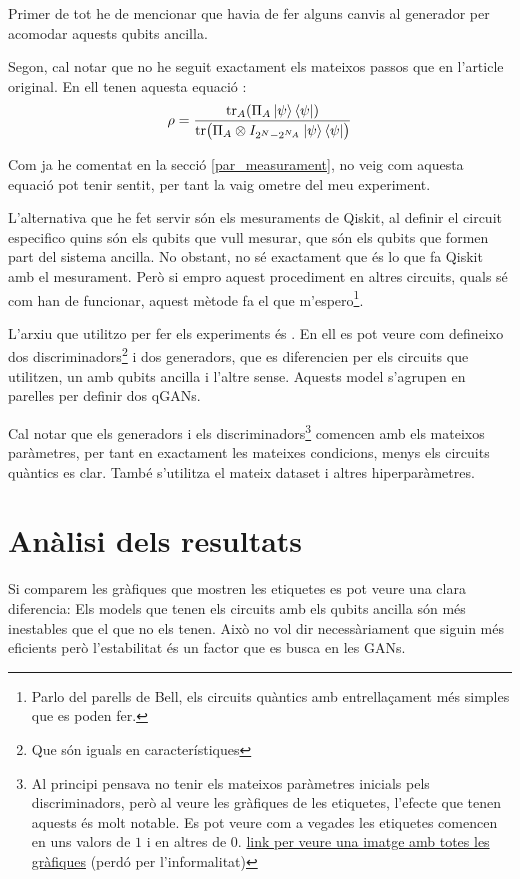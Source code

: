 Primer de tot he de mencionar que havia de fer alguns canvis al generador per acomodar aquests qubits ancilla. 

Segon, cal notar que no he seguit exactament els mateixos passos que en l'article original. En ell tenen aquesta equació \cite{QGAN_exp}: 
\begin{equation*}
\rho = \frac{\tr_A(\Pi_A \ket{\psi}\bra{\psi})}{\tr(\Pi_A\otimes I_{2^N-2^{N_A}}\ket{\psi}\bra{\psi})}
\end{equation*}

Com ja he comentat en la secció \ref{par_measurament}, no veig com aquesta equació pot tenir sentit, per tant la vaig ometre del meu experiment. 

L'alternativa que he fet servir són els mesuraments de Qiskit, al definir el circuit especifico quins són els qubits que vull mesurar, que són els qubits que formen part del sistema ancilla. No obstant, no sé exactament que és lo que fa Qiskit amb el mesurament. Però si empro aquest procediment en altres circuits, quals sé com han de funcionar, aquest mètode fa el que m'espero\footnote{Parlo del parells de Bell, els circuits quàntics amb entrellaçament més simples que es poden fer.}. 

L'arxiu que utilitzo per fer els experiments és . En ell es pot veure com defineixo dos discriminadors\footnote{Que són iguals en característiques} i dos generadors, que es diferencien per els circuits que utilitzen, un amb qubits ancilla i l'altre sense. Aquests model s'agrupen en parelles per definir dos qGANs. 

Cal notar que els generadors i els discriminadors\footnote{Al principi pensava no tenir els mateixos paràmetres inicials pels discriminadors, però al veure les gràfiques de les etiquetes, l'efecte que tenen aquests és molt notable. Es pot veure com a vegades les etiquetes comencen en uns valors de $1$ i en altres de $0$. \href{https://drive.google.com/file/d/1kYZ1vmNYU17sofNluXFYnoATLfY5B0jG/view?usp=sharing}{link per veure una imatge amb totes les gràfiques} (perdó per l'informalitat)} comencen amb els mateixos paràmetres, per tant en exactament les mateixes condicions, menys els circuits quàntics es clar. També s'utilitza el mateix dataset i altres hiperparàmetres. 

\section{Anàlisi dels resultats}
Si comparem les gràfiques que mostren les etiquetes es pot veure una clara diferencia: Els models que tenen els circuits amb els qubits ancilla són més inestables que el que no els tenen. Això no vol dir necessàriament que siguin més eficients però l'estabilitat és un factor que es busca en les GANs. 

